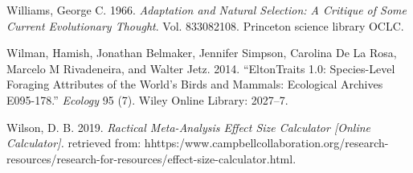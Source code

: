\documentclass[]{article}
\begin{document}
\leavevmode\hypertarget{ref-williams1966adaptation}{}%
Williams, George C. 1966. \emph{Adaptation and Natural Selection: A
Critique of Some Current Evolutionary Thought}. Vol. 833082108.
Princeton science library OCLC.

\leavevmode\hypertarget{ref-wilman2014eltontraits}{}%
Wilman, Hamish, Jonathan Belmaker, Jennifer Simpson, Carolina De La
Rosa, Marcelo M Rivadeneira, and Walter Jetz. 2014. ``EltonTraits 1.0:
Species-Level Foraging Attributes of the World's Birds and Mammals:
Ecological Archives E095-178.'' \emph{Ecology} 95 (7). Wiley Online
Library: 2027--7.

\leavevmode\hypertarget{ref-wilson2019calculator}{}%
Wilson, D. B. 2019. \emph{Ractical Meta-Analysis Effect Size Calculator
{[}Online Calculator{]}.} retrieved from:
hhttps:/www.campbellcollaboration.org/research-resources/research-for-resources/effect-size-calculator.html.
\end{document}
